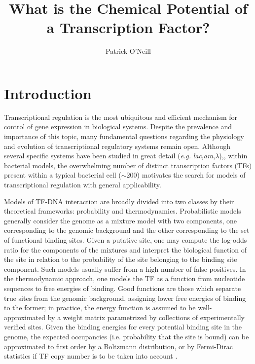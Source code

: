 \documentclass{article}
\begin{document}
\title{What is the Chemical Potential of a Transcription Factor?}
\author{Patrick O'Neill}
\maketitle{}
\section{Introduction}

\doublespacing Transcriptional regulation is the most ubiquitous and
efficient mechanism for control of gene expression in biological
systems.  Despite the prevalence and importance of this topic, many
fundamental questions regarding the physiology and evolution of
transcriptional regulatory systems remain open.  Although several
specific systems have been studied in great detail
(\textit{e.g.} \textit{lac},\textit{ara},$\lambda$)\cite{riggs70},\cite{hamilton88},\cite{ptashne67}
within bacterial models, the overwhelming number of distinct
transcription factors (TFs) present within a typical bacterial cell
($\sim 200$) motivates the search for models of transcriptional
regulation with general applicability.

Models of TF-DNA interaction are broadly divided into two classes by
their theoretical frameworks: probability and thermodynamics.
Probabilistic models generally consider the genome as a mixture model
with two components, one corresponding to the genomic background and
the other corresponding to the set of functional binding sites.  Given
a putative site, one may compute the log-odds ratio for the components
of the mixtures and interpret the biological function of the site in
relation to the probability of the site belonging to the binding site
component.  Such models usually suffer from a high number of false
positives\cite{erill09}.  In the thermodynamic approach, one models
the TF as a function from nucleotide sequences to free energies of
binding.  Good functions are those which separate true sites from the
genomic background, assigning lower free energies of binding to the
former; in practice, the energy function is assumed to be
well-approximated by a weight matrix parametrized by collections of
experimentally verified sites.  Given the binding energies for every
potential binding site in the genome, the expected occupancies
(i.e. probability that the site is bound) can be approximated to first
order by a Boltzmann distribution, or by Fermi-Dirac statistics if TF
copy number is to be taken into account \cite{gerland02}.
\end{document}
